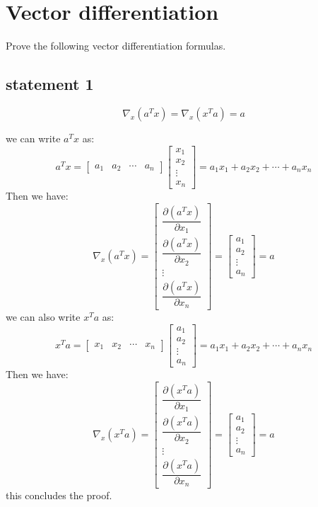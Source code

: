 \section{Vector differentiation}
Prove the following vector differentiation formulas.
\subsection{statement 1}
$$\nabla_x (a^T x) = \nabla_x (x^T a) = a$$
\begin{qsolve}
	\begin{qsolve}[]
		we can write $a^T x$ as:
		$$a^T x = \begin{bmatrix} a_1 & a_2 & \cdots & a_n \end{bmatrix} \begin{bmatrix} x_1 \\ x_2 \\ \vdots \\ x_n \end{bmatrix} = a_1 x_1 + a_2 x_2 + \cdots + a_n x_n$$
		Then we have:
		$$\nabla_x (a^T x) = \begin{bmatrix} \dfrac{\partial (a^T x)}{\partial x_1} \\ \dfrac{\partial (a^T x)}{\partial x_2} \\ \vdots \\ \dfrac{\partial (a^T x)}{\partial x_n} \end{bmatrix} = \begin{bmatrix} a_1 \\ a_2 \\ \vdots \\ a_n \end{bmatrix} = a$$
		we can also write $x^T a$ as:
		$$x^T a = \begin{bmatrix} x_1 & x_2 & \cdots & x_n \end{bmatrix} \begin{bmatrix} a_1 \\ a_2 \\ \vdots \\ a_n \end{bmatrix} = a_1 x_1 + a_2 x_2 + \cdots + a_n x_n$$
		Then we have:
		$$\nabla_x (x^T a) = \begin{bmatrix} \dfrac{\partial (x^T a)}{\partial x_1} \\ \dfrac{\partial (x^T a)}{\partial x_2} \\ \vdots \\ \dfrac{\partial (x^T a)}{\partial x_n} \end{bmatrix} = \begin{bmatrix} a_1 \\ a_2 \\ \vdots \\ a_n \end{bmatrix} = a$$
		this concludes the proof.
	\end{qsolve}
\end{qsolve}

